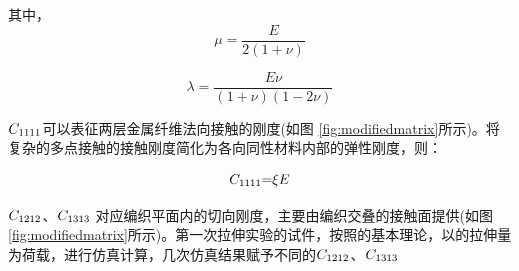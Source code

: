 其中， 
\begin{equation}
\mu  = \frac{E}{{2\left( {1 + \nu } \right)}}
\end{equation}

\begin{equation}
\lambda = \frac{{E\nu }}{{\left( {1 + \nu } \right)\left( {1 - 2\nu } \right)}}
\end{equation}


 $ {C_{{\rm{1111}}}} $可以表征两层金属纤维法向接触的刚度(如图 \ref{fig:modifiedmatrix}所示)。将复杂的多点接触的接触刚度简化为各向同性材料内部的弹性刚度，则：

\begin{equation}
{C_{{\rm{1111}}}}{\rm{ = }}\xi E
\end{equation}


$  {C_{{\rm{1212}}}} $、$ {C_{{\rm{1313}}}} $ 对应编织平面内的切向刚度，主要由编织交叠的接触面提供(如图 \ref{fig:modifiedmatrix}所示)。第一次拉伸实验的试件，按照\ha 的基本理论，以\shi 的拉伸量为荷载，进行仿真计算，几次仿真结果赋予不同的$  {C_{{\rm{1212}}}} $、$ {C_{{\rm{1313}}}} $


\begin{figure}[!htp]
\centering
{}
\end{figure}




